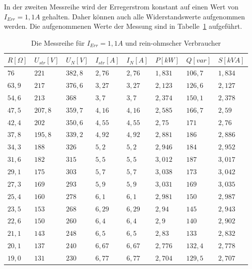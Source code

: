 \documentclass{report}
\begin{document}
In der zweiten Messreihe wird der Erregerstrom konstant auf einen Wert von $I_{Err} = 1,1A$ gehalten. Daher können auch alle Widerstandswerte aufgenommen werden. Die aufgenommenen Werte der Messung sind in Tabelle~\ref{tab:ohm_messreihe_2} aufgeführt.
\begin{table}[!ht]
	\centering
	\begin{tabular}{llllllll}
		\hline
		$R [\Omega]$ & $U_{str} [V]$ & $U_{N} [V]$ & $I_{str} [A]$ & $I_{N} [A]$ & $P [kW]$ & $Q [var]$ & $S [kVA]$ \\ \hline
		$76$         & $221$         & $382,8$     & $2,76$        & $2,76$      & $1,831$  & $106,7$   & $1,834$   \\
		$63,9$       & $217$         & $376,6$     & $3,27$        & $3,27$      & $2,123$  & $126,6$   & $2,127$   \\
		$54,6$       & $213$         & $368$       & $3,7$         & $3,7$       & $2,374$  & $150,1$   & $2,378$   \\
		$47,5$       & $207,8$       & $359,7$     & $4,16$        & $4,16$      & $2,585$  & $166,7$   & $2,59$    \\
		$42,4$       & $202$         & $350,6$     & $4,55$        & $4,55$      & $2,75$   & $171$     & $2,76$    \\
		$37,8$       & $195,8$       & $339,2$     & $4,92$        & $4,92$      & $2,881$  & $186$     & $2,886$   \\
		$34,3$       & $188$         & $326$       & $5,2$         & $5,2$       & $2,946$  & $184$     & $2,952$   \\
		$31,6$       & $182$         & $315$       & $5,5$         & $5,5$       & $3,012$  & $187$     & $3,017$   \\
		$29,1$       & $175$         & $303$       & $5,7$         & $5,7$       & $3,038$  & $173$     & $3,042$   \\
		$27,3$       & $169$         & $293$       & $5,9$         & $5,9$       & $3,031$  & $169$     & $3,035$   \\
		$25,4$       & $160$         & $278$       & $6,1$         & $6,1$       & $2,981$  & $150$     & $2,987$   \\
		$23,5$       & $153$         & $268$       & $6,29$        & $6,29$      & $2,94$   & $145$     & $2,943$   \\
		$22,6$       & $150$         & $260$       & $6,4$         & $6,4$       & $2,9$    & $140$     & $2,902$   \\
		$21,1$       & $143$         & $248$       & $6,5$         & $6,5$       & $2,83$   & $133$     & $2,832$   \\
		$20,1$       & $137$         & $240$       & $6,67$        & $6,67$      & $2,776$  & $132,4$   & $2,778$   \\
		$19,0$       & $131$         & $230$       & $6,77$        & $6,77$      & $2,704$  & $129,5$   & $2,707$   \\ \hline
	\end{tabular}
	\caption{Die Messreihe für $I_{Err} = 1,1A$ und rein-ohmscher Verbraucher}
	\label{tab:ohm_messreihe_2}
\end{table}
\end{document}
